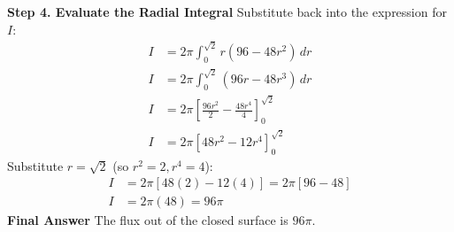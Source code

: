 \documentclass{article}
\begin{document}
\\
\\
\textbf{Step 4. Evaluate the Radial Integral}
Substitute back into the expression for $I$:
\begin{align*}
	I & = 2\pi \int_0^{\sqrt{2}} r (96 - 48r^2) \, dr                        \\
	I & = 2\pi \int_0^{\sqrt{2}} (96r - 48r^3) \, dr                         \\
	I & = 2\pi \left[ \frac{96r^2}{2} - \frac{48r^4}{4} \right]_0^{\sqrt{2}} \\
	I & = 2\pi \left[ 48r^2 - 12r^4 \right]_0^{\sqrt{2}}
\end{align*}
Substitute $r = \sqrt{2}$ (so $r^2=2, r^4=4$):
\begin{align*}
	I & = 2\pi [ 48(2) - 12(4) ] = 2\pi [ 96 - 48 ] \\
	I & = 2\pi (48) = 96\pi
\end{align*}
\textbf{Final Answer} The flux out of the closed surface is $96\pi$.

\pagebreak

\end{document}

